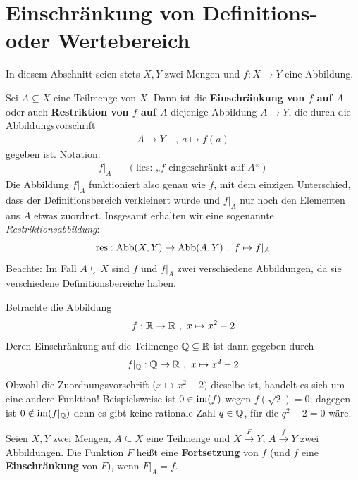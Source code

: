\section{Einschränkung von Definitions- oder Wertebereich}


In diesem Abschnitt seien stets $X,Y$ zwei Mengen und $f:X\to Y$ eine Abbildung.


\begin{de} 
    Sei $A \subseteq X$ eine Teilmenge von $X$. Dann ist die \textbf{Einschränkung von $f$ auf $A$} oder auch \textbf{Restriktion von $f$ auf $A$} diejenige Abbildung $A\to Y$, die durch die Abbildungsvorschrift
    \begin{align*}
        A \to Y \ &,\ a \mapsto f(a)
    \end{align*}
    gegeben ist. Notation:
    \begin{align*}
        f\vert_A && (\text{lies: „$f$ eingeschränkt auf $A$“})
    \end{align*}
    Die Abbildung $f\vert_{A}$ funktioniert also genau wie $f$, mit dem einzigen Unterschied, dass der Definitionsbereich verkleinert wurde und $f\vert_{A}$ nur noch den Elementen aus $A$ etwas zuordnet. Insgesamt erhalten wir eine sogenannte \emph{Restriktionsabbildung}:
        \[ \operatorname{res} : \operatorname{Abb}(X,Y) \to \operatorname{Abb}(A,Y) \ ,\ f \mapsto f\vert_A \]
    Beachte: Im Fall $A\subsetneq X$ sind $f$ und $f\vert_A$ zwei verschiedene Abbildungen, da sie verschiedene Definitionsbereiche haben.
\end{de}


\begin{bsp}
    Betrachte die Abbildung
        \[ f : \R \to \R \ ,\ x \mapsto x^2-2 \]
    Deren Einschränkung auf die Teilmenge $\mathbb Q\subseteq \mathbb R$ ist dann gegeben durch
        \[ f\vert_{\mathbb Q} : \mathbb Q \to \mathbb R \ ,\ x\mapsto x^2-2 \]
    Obwohl die Zuordnungsvorschrift ($x\mapsto x^2-2)$ dieselbe ist, handelt es sich um eine andere Funktion! Beispielsweise ist $0\in \operatorname{im}(f)$ wegen $f(\sqrt{2})=0$; dagegen ist $0\notin \operatorname{im}(f\vert_\mathbb Q)$ denn es gibt keine rationale Zahl $q\in \mathbb Q$, für die $q^2-2=0$ wäre.
\end{bsp}
 
 
\begin{de} \label{def:fortsetzung}  
    Seien $X,Y$ zwei Mengen, $A\subseteq X$ eine Teilmenge und $X\xrightarrow{F} Y$, $A\xrightarrow{f} Y$ zwei Abbildungen. Die Funktion $F$ heißt eine \textbf{Fortsetzung} von $f$ (und $f$ eine \textbf{Einschränkung} von $F$), wenn $F\vert_A=f$.
\end{de}



